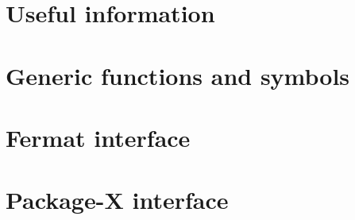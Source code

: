 
\chapter{Useful information}






\chapter{Generic functions and symbols}







\chapter{Fermat interface}












\chapter{Package-X interface}





























